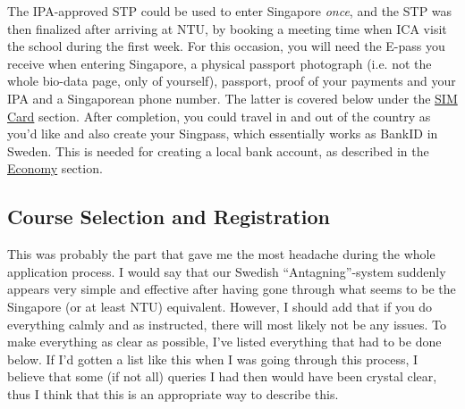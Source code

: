 The IPA-approved STP could be used to enter Singapore \textit{once}, and the STP was then finalized after arriving at NTU, by booking a meeting time when ICA visit the school during the first week. For this occasion, you will need the E-pass you receive when entering Singapore, a physical passport photograph (i.e. not the whole bio-data page, only of yourself), passport, proof of your payments and your IPA and a Singaporean phone number. The latter is covered below under the \hyperref[sims]{SIM Card} section. After completion, you could travel in and out of the country as you'd like and also create your Singpass, which essentially works as BankID in Sweden. This is needed for creating a local bank account, as described in the \hyperref[eco]{Economy} section.
 
\subsection*{Course Selection and Registration}
\label{courses}
This was probably the part that gave me the most headache during the whole application process. I would say that our Swedish ``Antagning''-system suddenly appears very simple and effective after having gone through what seems to be the Singapore (or at least NTU) equivalent. However, I should add that if you do everything calmly and as instructed, there will most likely not be any issues. To make everything as clear as possible, I've listed everything that had to be done below. If I'd gotten a list like this when I was going through this process, I believe that some (if not all) queries I had then would have been crystal clear, thus I think that this is an appropriate way to describe this. 
